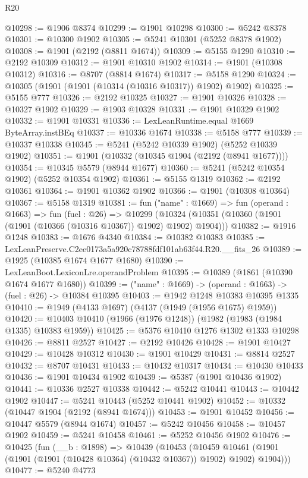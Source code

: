 \begin{lexlean}{R20}
\begin{coremodule}
@10298 := @1906 @8374
@10299 := @1901 @10298
@10300 := @5242 @8378
@10301 := @10300 @1902
@10305 := @5241 @10301 (@5252 @8378 @1902)
@10308 := @1901 (@2192 (@8811 @1674))
@10309 := @5155 @1290
@10310 := @2192 @10309
@10312 := @1901 @10310 @1902
@10314 := @1901 (@10308 @10312)
@10316 := @8707 (@8814 @1674)
@10317 := @5158 @1290
@10324 := @10305 (@1901 (@1901 (@10314 (@10316 @10317)) @1902) @1902)
@10325 := @5155 @777
@10326 := @2192 @10325
@10327 := @1901 @10326
@10328 := @10327 @1902
@10329 := @1903 @10328
@10331 := @1901 @10329 @1902
@10332 := @1901 @10331
@10336 := LexLeanRuntime.equal @1669 ByteArray.instBEq
@10337 := @10336 @1674
@10338 := @5158 @777
@10339 := @10337 @10338
@10345 := @5241 (@5242 @10339 @1902) (@5252 @10339 @1902)
@10351 := @1901 (@10332 (@10345 @1904 (@2192 (@8941 @1677))))
@10354 := @10345 @5579 (@8944 @1677)
@10360 := @5241 (@5242 @10354 @1902) (@5252 @10354 @1902)
@10361 := @5155 @1319
@10362 := @2192 @10361
@10364 := @1901 @10362 @1902
@10366 := @1901 (@10308 @10364)
@10367 := @5158 @1319
@10381 := fun ("name" : @1669) =>
  fun (operand : @1663) =>
  fun (fuel : @26) =>
  @10299 (@10324 (@10351 (@10360 (@1901 (@1901 (@10366 (@10316 @10367)) @1902) @1902) @1904)))
@10382 := @1916 @1248
@10383 := @1676 @4340
@10384 := @10382 @10383
@10385 := LexLeanPreserve.C2ee0173a5a920c78788fdf101ab63f44.R20.__fits_26
@10389 := @1925 (@10385 @1674 @1677 @1680)
@10390 := LexLeanBoot.LexiconLre.operandProblem
@10395 := @10389 (@1861 (@10390 @1674 @1677 @1680))
@10399 := ("name" : @1669) -> (operand : @1663) -> (fuel : @26) -> @10384 @10395
@10403 := @1942 @1248 @10383 @10395 @1335
@10410 := @1949 (@4133 @1697) (@4137 (@1949 (@1956 @1675) @1959))
@10420 := @10403 @10410 (@1966 (@1976 @1248)) (@1982 (@1983 (@1984 @1335) @10383 @1959))
@10425 := @5376 @10410 @1276 @1302 @1333 @10298
@10426 := @8811 @2527
@10427 := @2192 @10426
@10428 := @1901 @10427
@10429 := @10428 @10312
@10430 := @1901 @10429
@10431 := @8814 @2527
@10432 := @8707 @10431
@10433 := @10432 @10317
@10434 := @10430 @10433
@10436 := @1901 @10434 @1902
@10439 := @5387 (@1901 @10436 @1902)
@10441 := @10336 @2527 @10338
@10442 := @5242 @10441
@10443 := @10442 @1902
@10447 := @5241 @10443 (@5252 @10441 @1902)
@10452 := @10332 (@10447 @1904 (@2192 (@8941 @1674)))
@10453 := @1901 @10452
@10456 := @10447 @5579 (@8944 @1674)
@10457 := @5242 @10456
@10458 := @10457 @1902
@10459 := @5241 @10458
@10461 := @5252 @10456 @1902
@10476 := @10425
    (fun (__b : @1898) =>
    @10439
      (@10453
        (@10459 @10461 (@1901 (@1901 (@1901 (@10428 @10364) (@10432 @10367)) @1902) @1902) @1904)))
@10477 := @5240 @4773

\end{coremodule}
\end{lexlean}
